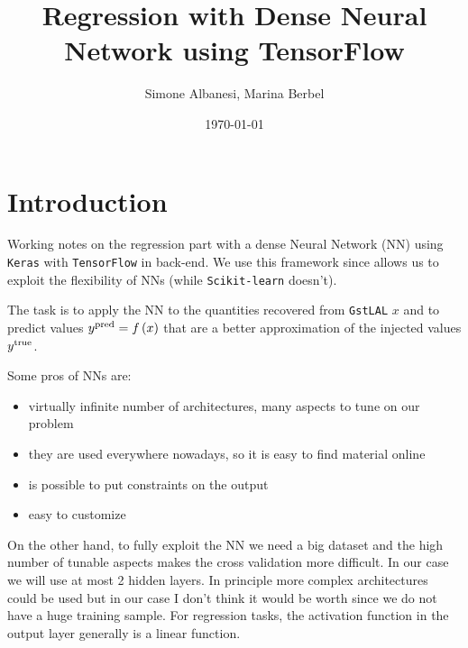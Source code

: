 \documentclass[prd,aps,twocolumn,a4paper,showkeys,nofootinbib]{article}
\begin{document}
\title{Regression with Dense Neural Network using TensorFlow}

\author{Simone Albanesi, Marina Berbel}

\date{\today}

\maketitle

\section{Introduction}
Working notes on the regression part with a dense Neural Network (NN)
using \texttt{Keras} with \texttt{TensorFlow} in back-end. We use this framework since allows us to
exploit the flexibility of NNs (while \texttt{Scikit-learn} doesn't).

The task is to apply the NN to the quantities recovered from \texttt{GstLAL} $x$ and to predict
values $y^{\rm pred} = f\left( x \right)$ that are a better approximation of the injected 
values $y^{\rm true}$.

Some pros of NNs are:
\begin{itemize}
\item virtually infinite number of architectures, many aspects to tune on our problem 
\item they are used everywhere nowadays, so it is easy to find material online
\item is possible to put constraints on the output
\item easy to customize
\end{itemize}
On the other hand, to fully exploit the NN we need a big dataset and the high number of tunable
aspects makes the cross validation more difficult. In our case we will use at most 2 hidden layers.
In principle more complex architectures could  be used but in our case 
I don't think it would be worth since we do not have a huge training sample. 
For regression tasks, the activation function in the output layer generally is a linear function.
\end{document}
